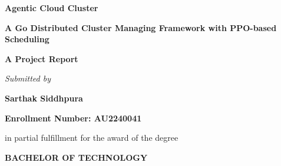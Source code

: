 %
%
%

\begin{titlepage}
   \begin{center}
       \vspace*{0.35cm}

      {\fontsize{22}{24}\selectfont\textbf{Agentic Cloud Cluster}}

      \vspace{0.25cm}

      {\fontsize{15}{17}\selectfont\textbf{A Go Distributed Cluster Managing Framework with PPO-based Scheduling}}

      \vspace{0.65cm}

      {\fontsize{14}{16}\selectfont\textbf{A Project Report}}

       \vspace{0.65cm}

       {\fontsize{14}{16}\selectfont\textit{Submitted by}}

       \vspace{0.35cm}

       {\fontsize{16}{18}\selectfont\textbf{Sarthak Siddhpura}}

       \vspace{0.2cm}

       {\fontsize{14}{16}\selectfont\textbf{Enrollment Number: AU2240041}}

       \vspace{0.45cm}

       {\fontsize{14}{16}\selectfont in partial fulfillment for the award of the degree}

       \vspace{0.35cm}

       {\fontsize{16}{18}\selectfont \textbf{BACHELOR OF TECHNOLOGY}}

       \vspace{0.35cm}


\end{center}
\end{titlepage}
